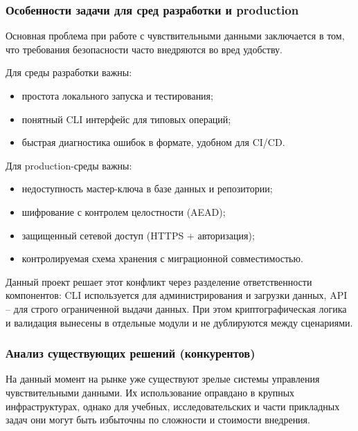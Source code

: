 \documentclass[14pt, a4paper]{extarticle}
\begin{document}
	\subsubsection{Особенности задачи для сред разработки и production}
	
	Основная проблема при работе с чувствительными данными заключается в том, что требования безопасности часто внедряются во вред удобству.
	
	Для среды разработки важны:
	
	\begin{itemize}
	\item простота локального запуска и тестирования;
	\item понятный CLI интерфейс для типовых операций;
	\item быстрая диагностика ошибок в формате, удобном для CI/CD.
	\end{itemize}
	
	Для production-среды важны:
	
	\begin{itemize}
	\item недоступность мастер-ключа в базе данных и репозитории;
	\item шифрование с контролем целостности (AEAD);
	\item защищенный сетевой доступ (HTTPS + авторизация);
	\item контролируемая схема хранения с миграционной совместимостью.
	\end{itemize}
	
	Данный проект решает этот конфликт через разделение ответственности компонентов: CLI используется для администрирования и загрузки данных, API -- для строго ограниченной выдачи данных. При этом криптографическая логика и валидация вынесены в отдельные модули и не дублируются между сценариями.
	
	\subsubsection{Анализ существующих решений (конкурентов)}
	
	На данный момент на рынке уже существуют зрелые системы управления чувствительными данными. Их использование оправдано в крупных инфраструктурах, однако для учебных, исследовательских и части прикладных задач они могут быть избыточны по сложности и стоимости внедрения.
	
\end{document}

